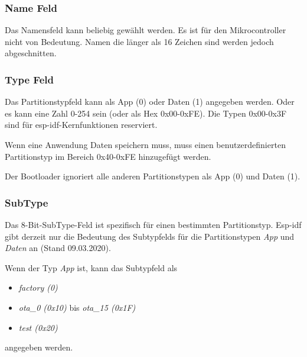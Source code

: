 \subsubsection{Name Feld}
Das Namensfeld kann beliebig gewählt werden. Es ist für den Mikrocontroller nicht von Bedeutung. Namen die länger als 16 Zeichen sind werden jedoch abgeschnitten.

\subsubsection{Type Feld}
Das Partitionstypfeld kann als App (0) oder Daten (1) angegeben werden. Oder es kann eine Zahl 0-254 sein (oder als Hex 0x00-0xFE). Die Typen 0x00-0x3F sind für esp-idf-Kernfunktionen reserviert.

Wenn eine Anwendung Daten speichern muss, muss einen benutzerdefinierten Partitionstyp im Bereich 0x40-0xFE hinzugefügt werden.

Der Bootloader ignoriert alle anderen Partitionstypen als App (0) und Daten (1).

\subsubsection{SubType}
Das 8-Bit-SubType-Feld ist spezifisch für einen bestimmten Partitionstyp. Esp-idf gibt derzeit nur die Bedeutung des Subtypfelds für die Partitionstypen \textit{App} und \textit{Daten} an (Stand 09.03.2020).

Wenn der Typ \textit{App} ist, kann das Subtypfeld als
\begin{itemize}
    \item \textit{factory (0)}
    \item \textit{ota\_0 (0x10)} bis \textit{ota\_15 (0x1F)}
    \item \textit{test (0x20)}
\end{itemize}
angegeben werden.

